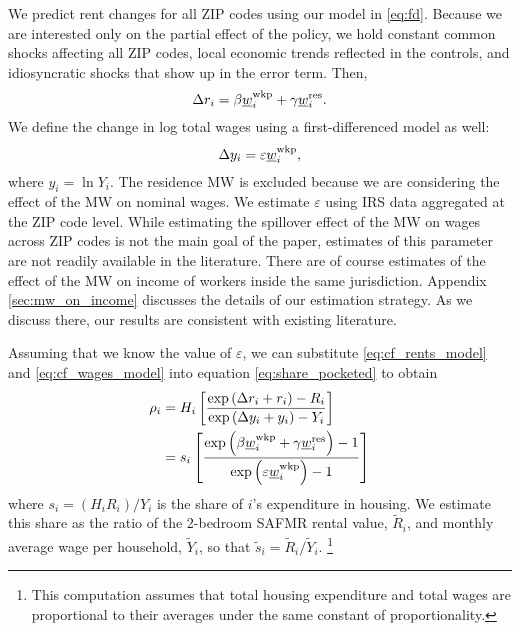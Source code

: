 We predict rent changes for all ZIP codes using our model in \eqref{eq:fd}.
Because we are interested only on the partial effect of the policy, we
hold constant common shocks affecting all ZIP codes,
local economic trends reflected in the controls, and
idiosyncratic shocks that show up in the error term.
Then,
\begin{equation}\label{eq:cf_rents_model}
    \Delta r_i = \beta \underline{w}_i^{\text{wkp}} + \gamma \underline{w}_i^{\text{res}} .
\end{equation}
We define the change in log total wages using a first-differenced model as well:
\begin{equation}\label{eq:cf_wages_model}
    \Delta y_i = \varepsilon \underline{w}_i^{\text{wkp}} ,
\end{equation}
where $y_i=\ln Y_i$.
The residence MW is excluded because we are considering the effect of the MW on 
nominal wages.
We estimate $\varepsilon$ using IRS data aggregated at the ZIP code level.
While estimating the spillover effect of the MW on wages across ZIP codes is 
not the main goal of the paper, 
estimates of this parameter are not readily available in the literature.
There are of course estimates of the effect of the MW on income of workers
inside the same jurisdiction.
Appendix \ref{sec:mw_on_income} discusses the details of our estimation 
strategy.
As we discuss there, our results are consistent with existing literature.

%
%
%

Assuming that we know the value of $\varepsilon$, we can substitute
\eqref{eq:cf_rents_model} and \eqref{eq:cf_wages_model} into equation
\eqref{eq:share_pocketed} to obtain
\begin{equation}\label{eq:rho}
    \begin{split}
        \rho_i & = H_i \left[ 
        \frac{\exp \left(\Delta r_i + r_i \right) - R_i }
             {\exp \left(\Delta y_i + y_i \right) - Y_i }
        \right] \\
        & = s_i \left[
            \frac{\exp \left( \beta \underline{w}_i^{\text{wkp}} + \gamma \underline{w}_i^{\text{res}} \right) - 1 }
                {\exp \left( \varepsilon \underline{w}_i^{\text{wkp}} \right) - 1 }
            \right]
    \end{split}
\end{equation}
where $s_i = \left(H_i R_i\right)/Y_i$ is the share of $i$'s expenditure in 
housing.
We estimate this share as the ratio of the 2-bedroom SAFMR rental value, 
$\tilde R_i$, and monthly average wage per household, $\tilde Y_i$,
so that $\tilde s_i = \tilde R_i/\tilde Y_i$.%
\footnote{This computation assumes that total housing expenditure and total
wages are proportional to their averages under the same constant of 
proportionality.}

